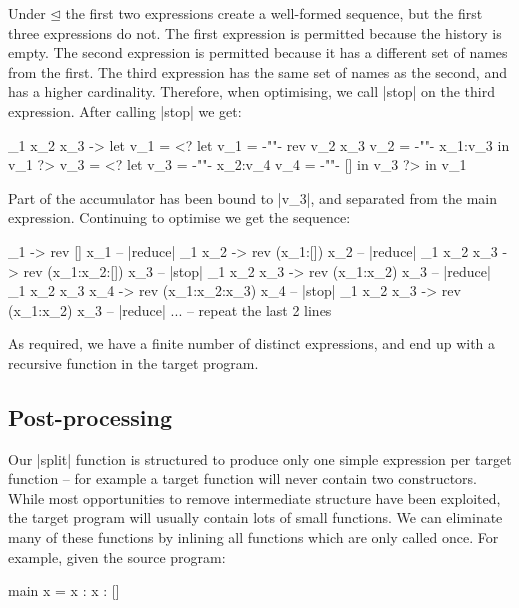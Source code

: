 \documentclass[draft]{sigplanconf}
\begin{document}
Under $\unlhd$ the first two expressions create a well-formed sequence, but the first three expressions do not. The first expression is permitted because the history is empty. The second expression is permitted because it has a different set of names from the first. The third expression has the same set of names as the second, and has a higher cardinality. Therefore, when optimising, we call |stop| on the third expression. After calling |stop| we get:

\begin{code}
\x_1 x_2 x_3 ->
    let  v_1 = <?  let  v_1  = {-""-}   rev v_2 x_3
                        v_2  = {-""-}   x_1:v_3
                   in   v_1 ?>
         v_3 = <?  let  v_3  = {-""-}   x_2:v_4
                        v_4  = {-""-}  []
                   in   v_3 ?>
    in   v_1
\end{code}

Part of the accumulator has been bound to |v_3|, and separated from the main expression. Continuing to optimise we get the sequence:

\begin{code}
\x_1 -> rev [] x_1                          -- |reduce|
\x_1 x_2 -> rev (x_1:[]) x_2                -- |reduce|
\x_1 x_2 x_3 -> rev (x_1:x_2:[]) x_3        -- |stop|
\x_1 x_2 x_3 -> rev (x_1:x_2) x_3           -- |reduce|
\x_1 x_2 x_3 x_4 -> rev (x_1:x_2:x_3) x_4   -- |stop|
\x_1 x_2 x_3 -> rev (x_1:x_2) x_3           -- |reduce|
... -- repeat the last 2 lines
\end{code}

As required, we have a finite number of distinct expressions, and end up with a recursive function in the target program.

\subsection{Post-processing}
\label{sec:postprocess}

Our |split| function is structured to produce only one simple expression per target function -- for example a target function will never contain two constructors. While most opportunities to remove intermediate structure have been exploited, the target program will usually contain lots of small functions. We can eliminate many of these functions by inlining all functions which are only called once. For example, given the source program:

\begin{code}
main x = x : x : []
\end{code}
\end{document}
